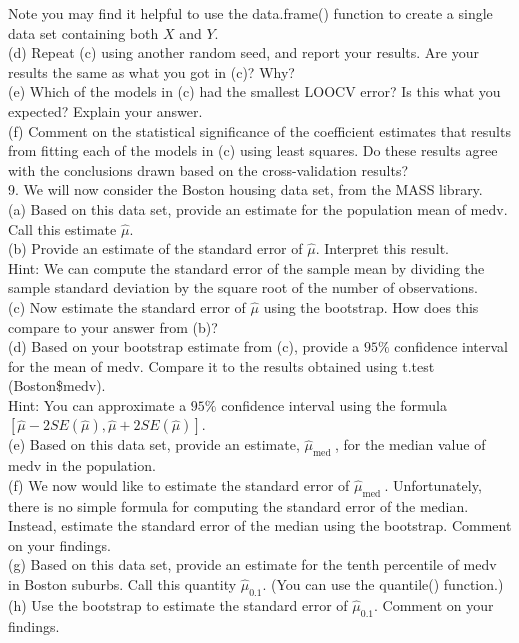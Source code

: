 \documentclass[10pt]{article}
\begin{document}
Note you may find it helpful to use the data.frame() function to create a single data set containing both $X$ and $Y$.\\
(d) Repeat (c) using another random seed, and report your results. Are your results the same as what you got in (c)? Why?\\
(e) Which of the models in (c) had the smallest LOOCV error? Is this what you expected? Explain your answer.\\
(f) Comment on the statistical significance of the coefficient estimates that results from fitting each of the models in (c) using least squares. Do these results agree with the conclusions drawn based on the cross-validation results?\\
9. We will now consider the Boston housing data set, from the MASS library.\\
(a) Based on this data set, provide an estimate for the population mean of medv. Call this estimate $\hat{\mu}$.\\
(b) Provide an estimate of the standard error of $\hat{\mu}$. Interpret this result.\\
Hint: We can compute the standard error of the sample mean by dividing the sample standard deviation by the square root of the number of observations.\\
(c) Now estimate the standard error of $\hat{\mu}$ using the bootstrap. How does this compare to your answer from (b)?\\
(d) Based on your bootstrap estimate from (c), provide a $95 \%$ confidence interval for the mean of medv. Compare it to the results obtained using t.test (Boston\$medv).\\
Hint: You can approximate a $95 \%$ confidence interval using the formula $[\hat{\mu}-2 S E(\hat{\mu}), \hat{\mu}+2 S E(\hat{\mu})]$.\\
(e) Based on this data set, provide an estimate, $\hat{\mu}_{\text {med }}$, for the median value of medv in the population.\\
(f) We now would like to estimate the standard error of $\hat{\mu}_{\text {med }}$. Unfortunately, there is no simple formula for computing the standard error of the median. Instead, estimate the standard error of the median using the bootstrap. Comment on your findings.\\
(g) Based on this data set, provide an estimate for the tenth percentile of medv in Boston suburbs. Call this quantity $\hat{\mu}_{0.1}$. (You can use the quantile() function.)\\
(h) Use the bootstrap to estimate the standard error of $\hat{\mu}_{0.1}$. Comment on your findings.
\end{document}
